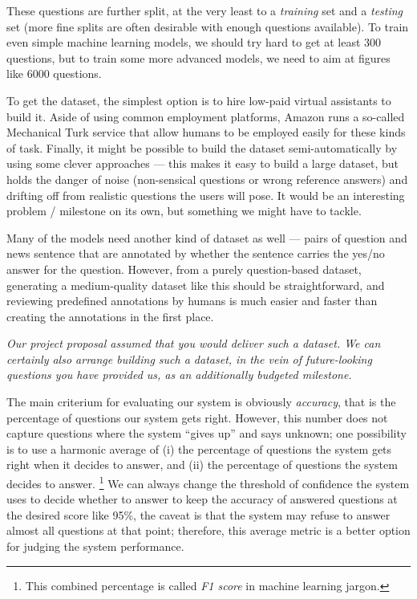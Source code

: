 \documentclass[11pt,a4paper]{article}
\begin{document}
These questions are further split, at the very least to a \textit{training}
set and a \textit{testing} set (more fine splits are often desirable
with enough questions available).
To train even simple machine learning models, we should try hard to get
at least 300 questions, but to train some more advanced models, we need
to aim at figures like 6000 questions.

To get the dataset, the simplest option is to hire low-paid virtual assistants
to build it.  Aside of using common employment platforms, Amazon runs a
so-called Mechanical Turk service that allow humans to be employed easily
for these kinds of task.  Finally, it might be possible to build the dataset
semi-automatically by using some clever approaches --- this makes it easy
to build a large dataset, but holds the danger of noise (non-sensical questions
or wrong reference answers) and drifting off from realistic questions the
users will pose.  It would be an interesting problem / milestone on its own,
but something we might have to tackle.

Many of the models need another kind of dataset as well --- pairs of question
and news sentence that are annotated by whether the sentence carries the yes/no
answer for the question.  However, from a purely question-based dataset,
generating a medium-quality dataset like this should be straightforward,
and reviewing predefined annotations by humans is much easier and faster
than creating the annotations in the first place.

\textit{Our project proposal assumed that you would deliver such a dataset.
	We can certainly also arrange building such a dataset, in the vein
	of future-looking questions you have provided us, as an additionally
budgeted milestone.}

The main criterium for evaluating our system is obviously \textit{accuracy},
that is the percentage of questions our system gets right.  However, this
number does not capture questions where the system ``gives up'' and says
unknown; one possibility is to use a harmonic average of (i) the percentage
of questions the system gets right when it decides to answer, and (ii) the
percentage of questions the system decides to answer.%
\footnote{This combined percentage is called \textit{F1 score} in machine learning jargon.}
We can always change the threshold of confidence the system uses to decide
whether to answer to keep the accuracy of answered questions at the desired
score like 95\%, the caveat is that the system may refuse to answer almost
all questions at that point; therefore, this average metric is a better
option for judging the system performance.
\end{document}
